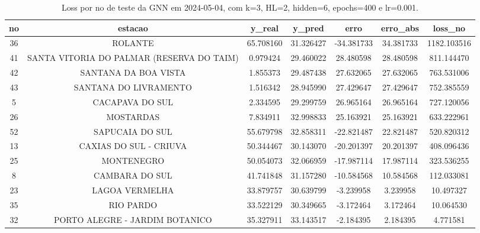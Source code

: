 \begin{table}[h]
\centering
\caption{Loss por no de teste da GNN em 2024-05-04, com k=3, HL=2, hidden=6, epochs=400 e lr=0.001.}
\label{tab:gnn_loss_k3_hl2_h6_e400_d20240504}
\begin{tabular}{ccccccc}
\toprule
no & estacao & y\_real & y\_pred & erro & erro\_abs & loss\_no \\
\midrule
36 & ROLANTE & 65.708160 & 31.326427 & -34.381733 & 34.381733 & 1182.103516 \\
41 & SANTA VITORIA DO PALMAR (RESERVA DO TAIM) & 0.979424 & 29.460022 & 28.480598 & 28.480598 & 811.144470 \\
42 & SANTANA DA BOA VISTA & 1.855373 & 29.487438 & 27.632065 & 27.632065 & 763.531006 \\
43 & SANTANA DO LIVRAMENTO & 1.516342 & 28.945990 & 27.429647 & 27.429647 & 752.385559 \\
5 & CACAPAVA DO SUL & 2.334595 & 29.299759 & 26.965164 & 26.965164 & 727.120056 \\
26 & MOSTARDAS & 7.834911 & 32.998833 & 25.163921 & 25.163921 & 633.222961 \\
52 & SAPUCAIA DO SUL & 55.679798 & 32.858311 & -22.821487 & 22.821487 & 520.820312 \\
13 & CAXIAS DO SUL - CRIUVA & 50.344467 & 30.143070 & -20.201397 & 20.201397 & 408.096436 \\
25 & MONTENEGRO & 50.054073 & 32.066959 & -17.987114 & 17.987114 & 323.536255 \\
8 & CAMBARA DO SUL & 41.741848 & 31.157280 & -10.584568 & 10.584568 & 112.033081 \\
23 & LAGOA VERMELHA & 33.879757 & 30.639799 & -3.239958 & 3.239958 & 10.497327 \\
35 & RIO PARDO & 33.522129 & 30.349665 & -3.172464 & 3.172464 & 10.064530 \\
32 & PORTO ALEGRE - JARDIM BOTANICO & 35.327911 & 33.143517 & -2.184395 & 2.184395 & 4.771581 \\
\bottomrule
\end{tabular}
\end{table}
